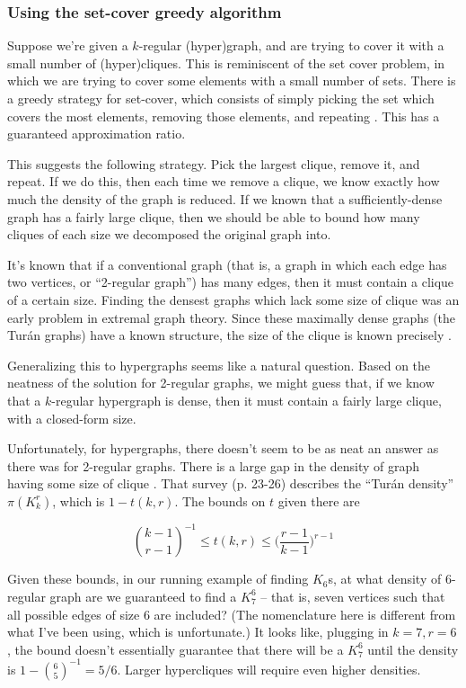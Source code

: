 \documentclass[12pt]{article}
\theoremstyle{definition}
\begin{document}
\subsubsection{Using the set-cover greedy algorithm}

Suppose we're given a $k$-regular (hyper)graph, and are trying to cover it
with a small number of (hyper)cliques. This is reminiscent of the
set cover problem, in which we are trying to cover some elements with
a small number of sets.
There is a greedy
strategy for set-cover, which consists
of simply picking the set which covers the most elements, removing those
elements, and repeating \cite{chvatal1979greedy}.
This has a guaranteed approximation ratio.

This suggests the following strategy. Pick the largest clique, remove it, and
repeat. If we do this, then each time we remove a clique, we know exactly
how much the density of the graph is reduced. If we known that a
sufficiently-dense graph has a fairly large clique, then we should be able
to bound how many cliques of each size we decomposed the original graph into.

It's known that if a conventional graph (that is, a graph
in which each edge has two vertices, or ``2-regular graph'')
has many edges, then it must contain
a clique of a certain size.
Finding the densest graphs which lack some size of clique was an
early problem in extremal graph theory. Since these maximally dense graphs
(the Tur\'an graphs) have a known structure, the size of the clique is
known precisely \cite{turan1941external}.

Generalizing this to hypergraphs seems like a natural question.
Based on the neatness of the solution for 2-regular graphs,
we might guess that, if we know that a $k$-regular hypergraph is dense,
then it must contain a fairly large clique, with a closed-form size.

Unfortunately, for hypergraphs, there doesn't seem to be as neat
an answer as there was for 2-regular graphs. 
There is a large gap in the density of graph having some size
of clique
\cite{keevash2011hypergraph}. That survey (p. 23-26)
describes the ``Tur\'an density'' $\pi(K^r_k)$,
which is $1 - t(k,r)$. The bounds on $t$ given there are

\[
{{k-1} \choose {r-1}}^{-1} \le t(k,r) \le \big(\frac{r-1}{ k-1 }\big)^{r-1}
\]

Given these bounds, in our running example of finding $K_6$s, at what density
of 6-regular graph are we guaranteed to find a $K^6_7$ -- that is, seven
vertices such that all possible edges of size 6 are included?
(The nomenclature here is different from what I've been using, which is
unfortunate.) It looks like, plugging in $k=7, r=6$, the bound doesn't
essentially
guarantee that there will be a $K^6_7$ until the density is
$1 - {6 \choose 5}^{-1} = 5/6$. Larger hypercliques will require even
higher densities.
\end{document}

